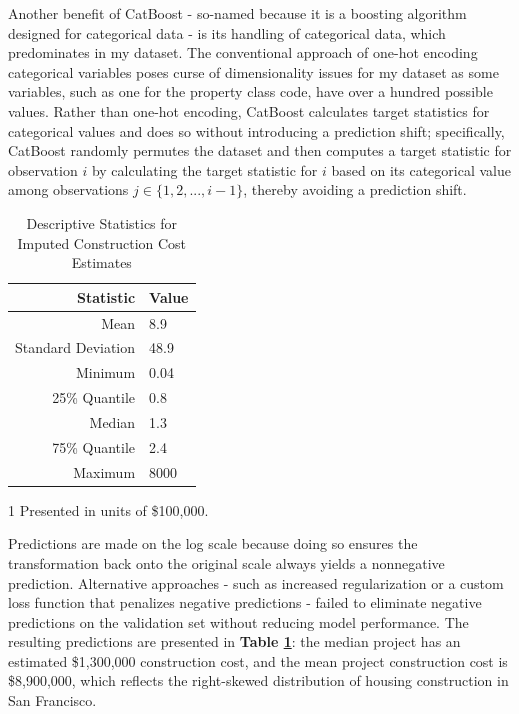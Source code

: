 \documentclass[a4paper,12pt]{article}
\begin{document}
Another benefit of CatBoost - so-named because it is a boosting algorithm designed for categorical data - is its handling of categorical data, which predominates in my dataset. The conventional approach of one-hot encoding categorical variables poses curse of dimensionality issues for my dataset as some variables, such as one for the property class code, have over a hundred possible values. Rather than one-hot encoding, CatBoost calculates target statistics for categorical values and does so without introducing a prediction shift; specifically, CatBoost randomly permutes the dataset and then computes a target statistic for observation $i$ by calculating the target statistic for $i$ based on its categorical value among observations $j \in \{1, 2, ..., i-1\}$, thereby avoiding a prediction shift.\cite{prokhorenkova2018catboost}

\begin{table}
    \centering
    \caption{Descriptive Statistics for Imputed Construction Cost Estimates}
    \setlength{\tabcolsep}{12pt}
            \label{tab:impute.construction}

        \begin{threeparttable}
            \begin{tabular}{rl}
            \hline
            Statistic & Value\tnote{1} \\
            \hline
            Mean & 8.9 \\
            Standard Deviation & 48.9 \\
            Minimum & 0.04 \\
            25\% Quantile & 0.8 \\
            Median & 1.3 \\
            75\% Quantile & 2.4 \\
            Maximum & 8000 \\
            \hline
            \end{tabular}
        \begin{tablenotes}
            \item[1]Presented in units of \$100,000.
        \end{tablenotes}
    \end{threeparttable}
\end{table}

Predictions are made on the log scale because doing so ensures the transformation back onto the original scale always yields a nonnegative prediction. Alternative approaches - such as increased regularization or a custom loss function that penalizes negative predictions - failed to eliminate negative predictions on the validation set without reducing model performance. The resulting predictions are presented in \textbf{Table \ref{tab:impute.construction}}: the median project has an estimated \$1,300,000 construction cost, and the mean project construction cost is \$8,900,000, which reflects the right-skewed distribution of housing construction in San Francisco.
\end{document}
